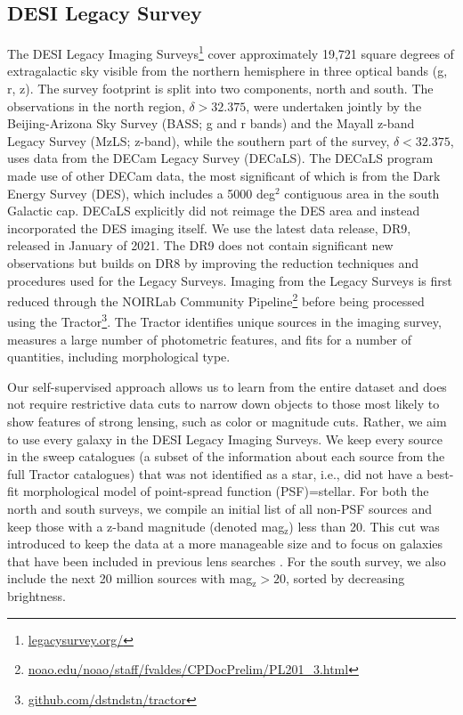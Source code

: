 \documentclass{aastex631}
\newcommand{\zmag}{mag$_{\mathrm{z}}$}
\begin{document}
\subsection{DESI Legacy Survey}

The DESI Legacy Imaging Surveys\footnote{\href{https://www.legacysurvey.org/}{legacysurvey.org/}} \citep{DECaLS} cover approximately 19,721 square degrees of extragalactic sky visible from the northern hemisphere in three optical bands (g, r, z).  The survey footprint is split into two components, north and south. The observations in the north region, $\delta > 32.375$, were undertaken jointly by the Beijing-Arizona Sky Survey (BASS; g and r bands) and the Mayall z-band Legacy Survey (MzLS; z-band), while the southern part of the survey, $\delta < 32.375$, uses data from the DECam Legacy Survey (DECaLS). The DECaLS program made use of other DECam data, the most significant of which is from the Dark Energy Survey (DES), which includes a 5000 deg$^2$ contiguous area in the south Galactic cap. DECaLS explicitly did not reimage the DES area and instead incorporated the DES imaging itself. We use the latest data release, DR9, released in January of 2021. The DR9 does not contain significant new observations but builds on DR8 by improving the reduction techniques and procedures used for the Legacy Surveys. Imaging from the Legacy Surveys is first reduced through the NOIRLab Community Pipeline\footnote{\href{https://www.noao.edu/noao/staff/fvaldes/CPDocPrelim/PL201_3.html}{noao.edu/noao/staff/fvaldes/CPDocPrelim/PL201\_3.html}} before being processed using the Tractor\footnote{\href{https://github.com/dstndstn/tractor}{github.com/dstndstn/tractor}}.  The Tractor identifies unique sources in the imaging survey, measures a large number of photometric features, and fits for a number of quantities, including morphological type.

Our self-supervised approach allows us to learn from the entire dataset and does not require restrictive data cuts to narrow down objects to those most likely to show features of strong lensing, such as color or magnitude cuts. Rather, we aim to use every galaxy in the DESI Legacy Imaging Surveys. We keep every source in the sweep catalogues (a subset of the information about each source from the full Tractor catalogues) that was not identified as a star, i.e., did not have a best-fit morphological model of point-spread function (PSF)=stellar. For both the north and south surveys, we compile an initial list of all non-PSF sources and keep those with a z-band magnitude (denoted \zmag) less than 20. This cut was introduced to keep the data at a more manageable size and to focus on galaxies that have been included in previous lens searches \citep{HuangII}. For the south survey, we also include the next 20 million sources with \zmag $> 20$, sorted by decreasing brightness. 
\end{document}
